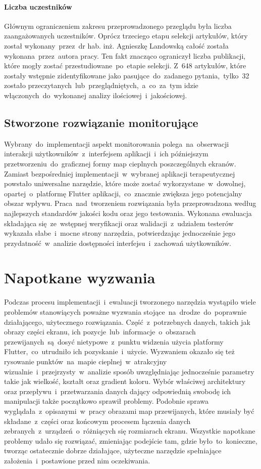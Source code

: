 \paragraph{Liczba uczestników}
Głównym ograniczeniem zakresu przeprowadzonego przeglądu była liczba zaangażowanych uczestników. Oprócz trzeciego etapu selekcji artykułów, który został wykonany~przez~dr hab. inż. Agnieszkę Landowską całość została wykonana~przez~autora pracy. Ten fakt znacząco ograniczył liczba publikacji, które mogły zostać przestudiowane~po~etapie selekcji. Z~648 artykułów, które zostały wstępnie zidentyfikowane jako pasujące~do~zadanego pytania,~tylko~32 zostało przeczytanych~lub~przeglądniętych,~a~co~za~tym idzie włączonych~do~wykonanej analizy ilościowej~i~jakościowej.

\subsection{Stworzone rozwiązanie monitorujące}
Wybrany~do~implementacji aspekt monitorowania polega~na~obserwacji interakcji użytkowników~z~interfejsem aplikacji~i~ich późniejszym przetworzeniu~do~graficznej formy map cieplnych poszczególnych ekranów. Zamiast bezpośredniej implementacji~w~wybranej aplikacji terapeutycznej powstało uniwersalne narzędzie, które może zostać wykorzystane~w~dowolnej, opartej~o~platformę Flutter aplikacji,~co~znacznie zwiększa jego potencjalny obszar wpływu. Praca~nad~tworzeniem rozwiązania była przeprowadzona według najlepszych standardów jakości kodu oraz jego testowania. Wykonana ewaluacja składająca się~ze~wstępnej weryfikacji oraz walidacji~z~udziałem testerów wykazała słabe~i~mocne strony narzędzia, potwierdzając jednocześnie jego przydatność~w~analizie dostępności interfejsu~i~zachowań użytkowników. 
	
\section{Napotkane wyzwania}
Podczas procesu implementacji~i~ewaluacji tworzonego narzędzia wystąpiło wiele problemów stanowiących poważne wyzwania stojące~na~drodze~do~poprawnie działającego, użytecznego rozwiązania. Część~z~potrzebnych danych, takich jak obrazy części ekranu, ich pozycje~lub~informacje~o~obszarach przewijanych~są~dosyć nietypowe~z~punktu widzenia użycia platformy Flutter,~co~utrudniło ich pozyskanie~i~użycie. Wyzwaniem okazało się też rysowanie punktów~na~mapie cieplnej~w~atrakcyjny wizualnie~i~przejrzysty~w~analizie sposób uwzględniając jednocześnie parametry takie jak wielkość, kształt oraz gradient koloru. Wybór właściwej architektury oraz przepływu~i~przetwarzania danych dający odpowiednią swobodę ich manipulacji także początkowo sprawił problemy. Podobnie sprawa wyglądała~z~opisanymi~w~pracy obrazami map przewijanych, które musiały być składane~z~części oraz końcowym procesem łączenia danych zebranych~z~urządzeń~o~różniących się rozmiarach ekranu. Wszystkie napotkane problemy udało się rozwiązać, zmieniając podejście tam, gdzie było~to~konieczne, tworząc ostatecznie dobrze działające, użyteczne narzędzie spełniające założenia~i~postawione przed nim oczekiwania.
